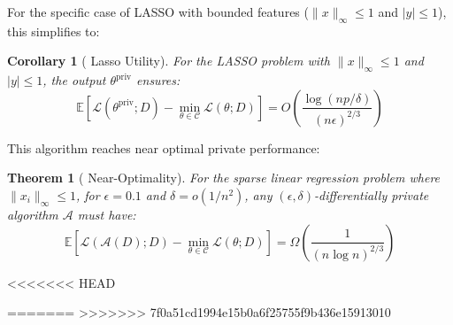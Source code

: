 \documentclass[12pt,letterpaper]{article}
\newtheorem{theorem}{Theorem}[section]
\newtheorem{corollary}{Corollary}[theorem]
\begin{document}
For the specific case of LASSO with bounded features ($\|x\|_{\infty} \leq 1$ and $|y| \leq 1$), this simplifies to:


\begin{corollary}[\cite{NIPS2015_52d080a3} Lasso Utility]
    \label{thm:utilcor}
    For the LASSO problem with $\|x\|_{\infty} \leq 1$ and $|y| \leq 1$, the output $\theta^{\text{priv}}$ ensures:
    \[
    \mathbb{E}[\mathcal{L}(\theta^{\text{priv}}; D) - \min_{\theta \in \mathcal{C}}\mathcal{L}(\theta; D)] = O\left(\frac{\log(np/\delta)}{(n\epsilon)^{2/3}}\right)
    \]
\end{corollary}

This algorithm reaches near optimal private performance: 


\begin{theorem}[\cite{NIPS2015_52d080a3} Near-Optimality]
    \label{thm:NearOpt}
    For the sparse linear regression problem where $\|x_i\|_{\infty} \leq 1$, for $\epsilon = 0.1$ and $\delta = o(1/n^2)$, any $(\epsilon, \delta)$-differentially private algorithm $\mathcal{A}$ must have:
    \[
    \mathbb{E}[\mathcal{L}(\mathcal{A}(D); D) - \min_{\theta \in \mathcal{C}}\mathcal{L}(\theta; D)] = \Omega\left(\frac{1}{(n\log n)^{2/3}}\right)
    \]
\end{theorem}
<<<<<<< HEAD


=======
>>>>>>> 7f0a51cd1994e15b0a6f25755f9b436e15913010
\end{document}
